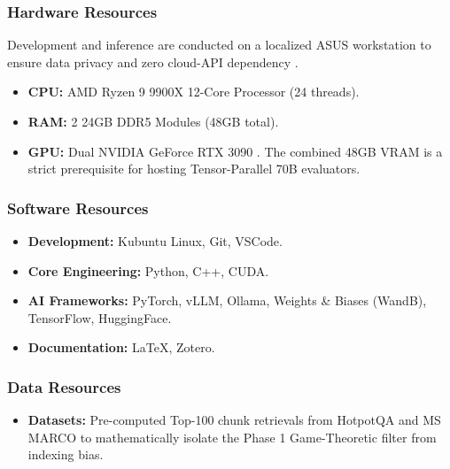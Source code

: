 \subsubsection*{Hardware Resources}
\label{subsubsec:hardware-resources}
Development and inference are conducted on a localized ASUS workstation to ensure data privacy and zero cloud-API dependency .
\begin{itemize}
    \item \textbf{CPU:} AMD Ryzen 9 9900X 12-Core Processor (24 threads).
    \item \textbf{RAM:} 2 24GB DDR5 Modules (48GB total).
    \item \textbf{GPU:} Dual NVIDIA GeForce RTX 3090 . The combined 48GB VRAM is a strict prerequisite for hosting Tensor-Parallel 70B evaluators.
\end{itemize}

\subsubsection*{Software Resources}
\label{subsubsec:software-resources}
\begin{itemize}
    \item \textbf{Development:} Kubuntu Linux, Git, VSCode.
    \item \textbf{Core Engineering:} Python, C++, CUDA.
    \item \textbf{AI Frameworks:} PyTorch, vLLM, Ollama, Weights \& Biases (WandB), TensorFlow, HuggingFace.
    \item \textbf{Documentation:} LaTeX, Zotero.
\end{itemize}

\subsubsection*{Data Resources}
\label{subsubsec:data-resources}
\begin{itemize}
    \item \textbf{Datasets:} Pre-computed Top-100 chunk retrievals from HotpotQA and MS MARCO to mathematically isolate the Phase 1 Game-Theoretic filter from indexing bias.
\end{itemize}
